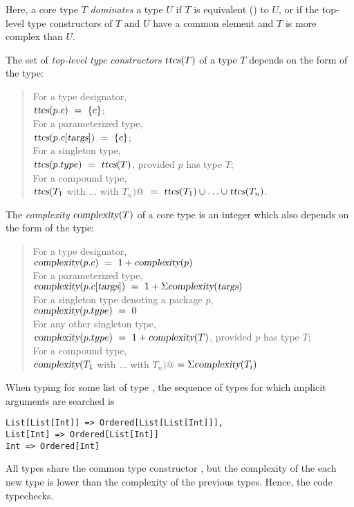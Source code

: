 Here, a core type $T$ {\em dominates} a type $U$ if $T$ is equivalent ()
to $U$, or if the top-level type constructors of $T$ and $U$ have a
common element and $T$ is more complex than $U$.

The set of {\em top-level type constructors} $\mbox{\sl ttcs}(T)$ of a type $T$ depends on the form of
the type:
\begin{quote}
For a type designator, \\
$\mbox{\sl ttcs}(p.c) ~=~ \{c\}$; \\
For a parameterized type, \\
$\mbox{\sl ttcs}(p.c[\mbox{\sl targs}]) ~=~ \{c\}$; \\
For a singleton type, \\
$\mbox{\sl ttcs}(p.type) ~=~ \mbox{\sl ttcs}(T)$, provided $p$ has type $T$;\\
For a compound type, \\
\lstinline@$\mbox{\sl ttcs}(T_1$ with $\ldots$ with $T_n)$@ $~=~ \mbox{\sl ttcs}(T_1) \cup \ldots \cup \mbox{\sl ttcs}(T_n)$.
\end{quote}

The {\em complexity} $\mbox{\sl complexity}(T)$ of a core type is an integer which also depends on the form of
the type:
\begin{quote}
For a type designator, \\
$\mbox{\sl complexity}(p.c) ~=~ 1 + \mbox{\sl complexity}(p)$ \\
For a parameterized type, \\
$\mbox{\sl complexity}(p.c[\mbox{\sl targs}]) ~=~ 1 + \Sigma \mbox{\sl complexity}(\mbox{\sl targs})$ \\
For a singleton type denoting a package $p$, \\
$\mbox{\sl complexity}(p.type) ~=~ 0$ \\
For any other singleton type, \\
$\mbox{\sl complexity}(p.type) ~=~ 1 + \mbox{\sl complexity}(T)$, provided $p$ has type $T$;\\
For a compound type, \\
\lstinline@$\mbox{\sl complexity}(T_1$ with $\ldots$ with $T_n)$@ $= \Sigma\mbox{\sl complexity}(T_i)$
\end{quote}

\example When typing  for some list  of type , 
the sequence of types for 
which implicit arguments are searched is 
\begin{lstlisting}
List[List[Int]] => Ordered[List[List[Int]]], 
List[Int] => Ordered[List[Int]]
Int => Ordered[Int]
\end{lstlisting}
All types share the common type constructor , 
but the complexity of the each new type is lower than the complexity of the previous types. 
Hence, the code typechecks.

